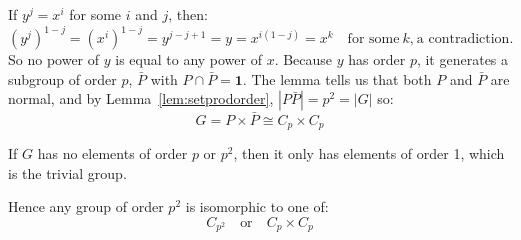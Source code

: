 \documentclass[a4paper, oneside, 12pt, final]{article}
\theoremstyle{definition}
\DeclareMathOperator{\z}{Z}
\DeclareMathOperator{\C}{C}
\newcommand{\nrmsgp}{\unlhd}
\begin{document}
If \(y^j = x^i\) for some \(i\) and \(j\), then:
\[{(y^j)}^{1-j} = {(x^i)}^{1-j} = y^{j-j+1} = y = x^{i(1-j)} = x^k \quad \text{for some} \ k\text{,} \ \text{a
contradiction.}\]
So no power of \(y\) is equal to any power of \(x\).
Because \(y\) has order \(p\), it generates a subgroup of order \(p\), \(\bar{P}\) with \(P \cap \bar{P} = \bm{1}\).
The lemma tells us that both \(P\) and \(\bar{P}\) are normal, and by Lemma~\ref{lem:setprodorder}, \(|P\bar{P}| = p^2 =
|G|\) so:
\[G = P \times \bar{P} \cong C_p \times C_p\]

If \(G\) has no elements of order \(p\) or \(p^2\), then it only has elements of order 1, which is the trivial group.

Hence any group of order \(p^2\) is isomorphic to one of:
\[C_{p^2} \quad \text{or} \quad C_p \times C_p\]



%
%
%
%
%
%
\end{document}
